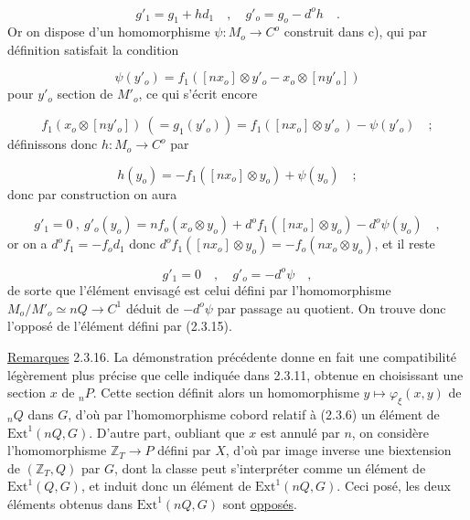 \begin{equation*}
g'_1 = g_1 + hd_1 \quad , \quad g'_o = g_o - d^o h \quad .
\end{equation*}
Or on dispose d'un homomorphisme $\psi : M_o \longrightarrow C^o$ construit dans c), qui par définition satisfait la condition

\begin{equation*}
\psi(y'_o) = f_1([nx_o] \otimes y'_o - x_o \otimes [ny'_o])
\end{equation*}
pour $y'_o$ section de $M'_o$, ce qui s'écrit encore

\begin{equation*}
f_1(x_o \otimes [ny'_o]) \ (= g_1(y'_o)) = f_1([nx_o] \otimes y'_o \ ) - \psi(y'_o) \quad ;
\end{equation*}
définissons donc $h : M_o \longrightarrow C^o$ par 



\begin{equation*}
 h(y_o) = -f_1([nx_o] \otimes y_o) + \psi(y_o) \quad ;
\end{equation*}
donc par construction on aura

\begin{equation*}
g'_1 = 0 \ , \ g'_o(y_o) = nf_o(x_o \otimes y_o) + d^o f_1([nx_o] \otimes y_o) - d^o \psi(y_o) \quad ,
\end{equation*}
or on a $d^o f_1 = -f_o d_1$ donc $d^o f_1([nx_o] \otimes y_o) = - f_o(nx_o \otimes y_o)$, et il reste

\begin{equation*}
g'_1 = 0 \quad , \quad g'_o = -d^o \psi \quad ,
\end{equation*}
de sorte que l'élément envisagé est celui défini par l'homomorphisme $M_o/M'_o \simeq nQ \longrightarrow C^1$ déduit de $- d^o \psi$ par passage au quotient. On trouve donc l'opposé de l'élément défini par (2.3.15).

\underline{Remarques} 2.3.16. \quad La démonstration précédente donne en fait une compatibilité légèrement plus précise que celle indiquée dans 2.3.11, obtenue en choisissant une section $x$ de ${}_nP$. Cette section définit alors un homomorphisme $y \longmapsto \varphi_\xi(x,y)$ de ${}_nQ$ dans $G$, d'où par l'homomorphisme cobord relatif à (2.3.6) un élément de $\mathrm{Ext}^1(nQ,G)$. D'autre part, oubliant que $x$ est annulé par $n$, on considère l'homomorphisme $\mathbb{Z}_T \longrightarrow P$ défini par $X$, d'où par image inverse une biextension de $(\mathbb{Z}_T,Q)$ par $G$, dont la classe peut s'interpréter comme un élément de $\mathrm{Ext}^1(Q,G)$, et induit donc un élément de $\mathrm{Ext}^1(nQ,G)$. Ceci posé, les deux éléments obtenus dans $\mathrm{Ext}^1(nQ,G)$ sont \underline{opposés}.

